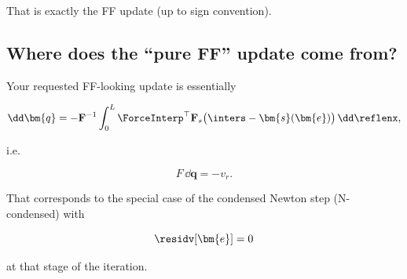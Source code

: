 That is exactly the FF update (up to sign convention).




\subsection{Where does the ``pure FF'' update come from?}

Your requested FF-looking update is essentially

\[\dd \bm{q} = -\mathbf{F}^{-1}\int_0^L \ForceInterp^{\top} \mathbf{F}_{s}\big(\inters-\bm{s}(\bm{e})\big)\,\dd\reflenx,\]

i.e.

\[F\,\dd \bm{q} = -v_r.\]

That corresponds to the special case of the condensed Newton step
(N-condensed) with

\[\residv[\bm{e}]=0\]

at that stage of the iteration.

